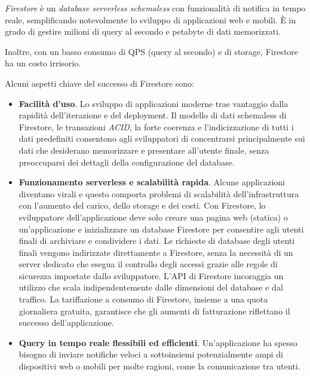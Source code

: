 \textit{Firestore} è un \textit{database serverless schemaless} con funzionalità di notifica in tempo reale, semplificando notevolmente lo sviluppo di applicazioni web e mobili. È in grado di gestire milioni di query al secondo e petabyte di dati memorizzati.

Inoltre, con un basso consumo di QPS (query al secondo) e di storage, Firestore ha un costo irrisorio.

Alcuni aspetti chiave del successo di Firestore sono\cite{kesavan2023firestore}:
\begin{itemize}
    \item \textbf{Facilità d'uso}. Lo sviluppo di applicazioni moderne trae vantaggio dalla rapidità dell'iterazione e del deployment. Il modello di dati schemaless di Firestore, le transazioni \textit{ACID}, la forte coerenza e l'indicizzazione di tutti i dati predefiniti consentono agli sviluppatori di concentrarsi principalmente sui dati che desiderano memorizzare e presentare all'utente finale, senza preoccuparsi dei dettagli della configurazione del database.
    \item \textbf{Funzionamento serverless e scalabilità rapida}. Alcune applicazioni diventano virali e questo comporta problemi di scalabilità dell'infrastruttura con l'aumento del carico, dello storage e dei costi. Con Firestore, lo sviluppatore dell'applicazione deve solo creare una pagina web (statica) o un'applicazione e inizializzare un database Firestore per consentire agli utenti finali di archiviare e condividere i dati. Le richieste di database degli utenti finali vengono indirizzate direttamente a Firestore, senza la necessità di un server dedicato che esegua il controllo degli accessi grazie alle regole di sicurezza impostate dallo sviluppatore. L'API di Firestore incoraggia un utilizzo che scala indipendentemente dalle dimensioni del database e dal traffico.
    La tariffazione a consumo di Firestore, insieme a una quota giornaliera gratuita, garantisce che gli aumenti di fatturazione riflettano il successo dell'applicazione.
    \item \textbf{Query in tempo reale flessibili ed efficienti}. Un'applicazione ha spesso bisogno di inviare notifiche veloci a sottoinsiemi potenzialmente ampi di dispositivi web o mobili per molte ragioni, come la comunicazione tra utenti.
\end{itemize}